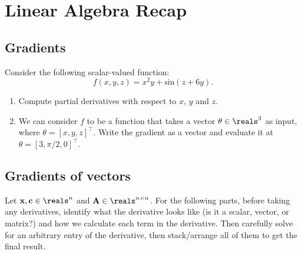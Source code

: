 \clearpage

\section{Linear Algebra Recap}
\subsection{Gradients}
Consider the following scalar-valued function: 
$$
    f(x, y, z) = x^2y + \text{sin}(z+6y). 
$$

\begin{enumerate}
    \item Compute partial derivatives with respect to $x$, $y$ and $z$. \\
    
    \item We can consider $f$ to be a function that takes a vector $\theta \in \reals^3$ as input, where $\theta = [x, y, z]^\top$. 
    Write the gradient as a vector and evaluate it at $\theta = [3, \pi/2, 0]^\top$.\\
\end{enumerate}






\subsection{Gradients of vectors}

Let $\mathbf{x}, \mathbf{c} \in \reals^n$ and $\mathbf{A} \in \reals^{n \times n}$. 
For the following parts, before taking any derivatives, identify what the
derivative looks like (is it a scalar, vector, or matrix?) and how we calculate each term in the derivative. Then carefully solve for an arbitrary entry of the derivative, then stack/arrange all of them to get the final
result. 

